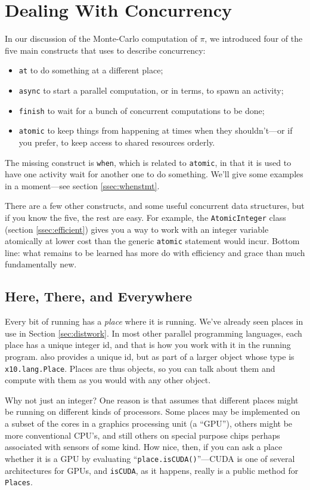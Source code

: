 \chapter{Dealing With Concurrency}\label{chap:concurrency}

In our discussion of the Monte-Carlo computation of $\pi$, we introduced four
of the five main constructs that \Xten{} uses to describe 
concurrency:
\begin{itemize}
\item {\tt at} to do something at a different place;
\item {\tt async} to start a parallel computation, or in \Xten{} terms, to
spawn an activity;
\item {\tt finish} to wait for a bunch of concurrent computations to be done;
\item {\tt atomic} to keep things from happening at
      times when they shouldn't---or if you prefer, to keep access to shared
      resources orderly.
\end{itemize}
The missing construct is {\tt when}, which is related to {\tt atomic}, 
in that it is used to have one activity wait for another one to do something.
We'll give some examples in a moment---see
section \ref{ssec:whenstmt}.

There are a few other \Xten{} constructs, and some useful concurrent data
structures, but if you know the five, the rest are easy.  For
example, the {\tt AtomicInteger} class (section \ref{ssec:efficient}) gives you a
way to work with an integer variable atomically at lower cost than
the generic {\tt atomic} statement would incur.  Bottom line: what remains
to be learned has more do with efficiency and grace than much fundamentally new.

\section{Here, There, and Everywhere}

Every bit of running \Xten{} has a {\em place} where it is running.  We've already
seen places in use in Section \ref{sec:distwork}.  In most other
parallel programming languages, each place has a unique integer id,
and that is how you work with it in the running program.
\Xten{} also provides a unique id, but as part of a larger object whose
type is {\tt x10.lang.Place}.  Places are thus objects, so
you can talk about them and compute with them as you would with any
other object.  

Why not just an integer?  One reason is that \Xten{}
assumes that different places might be running on different kinds of 
processors.
Some places may be implemented on a subset
of the cores in a graphics processing unit (a ``GPU''),
others might be more conventional CPU's,
and still others on special purpose chips perhaps associated with sensors of
some kind. How nice, then, if you can ask a place whether it is a GPU by
evaluating ``{\tt place.isCUDA()}''---CUDA is one of several architectures
for GPUs, and {\tt isCUDA}, as it happens, really is a public method
for {\tt Places}.  

